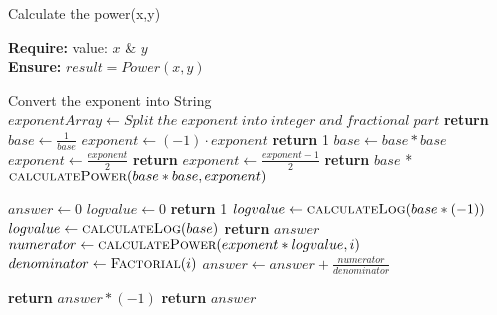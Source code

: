 \documentclass[a4paper, 12pt]{article}
\begin{document}
\begin{algorithm}
\caption{Calculate the power(x,y)}

\textbf{Require:}  value: $x$ \& $y$  \\
\textbf{Ensure:} $result = Power(x,y)$
\begin{algorithmic}[1]

    \State Convert the exponent into String
    \State $exponentArray \leftarrow Split\;the\;exponent\;into\;integer\;and\;fractional\;part$
    \State \textbf{return} 
    \EndIf
    \State $base \leftarrow \frac{1}{base}$
    \State $exponent \leftarrow (-1) \cdot exponent$
    \EndIf
    \State \textbf{return} 1
    \EndIf
    \State $base \leftarrow base * base$
    \State $exponent \leftarrow \frac{exponent}{2}$
    \State \textbf{return} 
    \Else
    \State $exponent \leftarrow \frac{exponent-1}{2}$
    \State \textbf{return} $base$ * $\Call{calculatePower}{base*base,exponent}$
    \EndIf
    \EndProcedure
\Statex


    \State $answer \leftarrow 0$
    \State $logvalue \leftarrow 0$
    \State \textbf{return} 1
    \EndIf
    \State $logvalue \leftarrow \Call{calculateLog}{base * (-1)}$
    \Else
    \State $logvalue \leftarrow \Call{calculateLog}{base}$
    \EndIf
    \State \textbf{return} $answer$
    \EndIf
    \State $numerator \leftarrow \Call{calculatePower}{exponent*logvalue,i}$
    \State $denominator \leftarrow \Call{Factorial}{i}$
    \State $answer \leftarrow answer + \frac{numerator}{denominator}$
    \EndFor
    
    \State \textbf{return} $answer * (-1)$
    \Else
    \State \textbf{return} $answer$
    \EndIf
    \EndProcedure
\Statex

\end{algorithmic}
\end{algorithm}


\newpage
\end{document}
